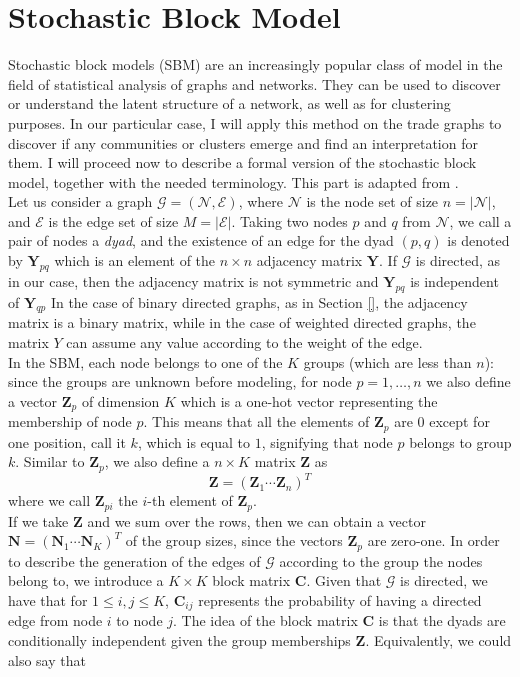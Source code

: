 \section{Stochastic Block Model}\label{sec:sbm}
Stochastic block models (SBM) are an increasingly popular class of model in the field of statistical analysis of graphs and networks. They can be used to discover or understand the latent structure of a network, as well as for clustering purposes. In our particular case, I will apply this method on the trade graphs to discover if any communities or clusters emerge and find an interpretation for them.
I will proceed now to describe a formal version of the stochastic block model, together with the needed terminology. This part is adapted from \textcite{lee2019review}.\\
Let us consider a graph $\mathcal{G} = (\mathcal{N},\mathcal{E})$, where $\mathcal{N}$ is the node set of size $n = |\mathcal{N}|$, and $\mathcal{E}$ is the edge set of size $M = |\mathcal{E}|$. Taking two nodes $p$ and $q$ from $\mathcal{N}$, we call a pair of nodes a \textit{dyad}, and the existence of an edge for the dyad $(p,q)$ is denoted by $\mathbf{Y}_{pq}$ which is an element of the $n \times n$ adjacency matrix $\mathbf{Y}$. If $\mathcal{G}$ is directed, as in our case, then the adjacency matrix is not symmetric and $\mathbf{Y}_{pq}$ is independent of $\mathbf{Y}_{qp}$ In the case of binary directed graphs, as in Section \ref{}, the adjacency matrix is a binary matrix, while in the case of weighted directed graphs, the matrix $Y$ can assume any value according to the weight of the edge.\\
In the SBM, each node belongs to one of the $K$ groups (which are less than $n$): since the groups are unknown before modeling, for node $p = 1,\ldots,n$ we also define a vector $\mathbf{Z}_p$ of dimension $K$ which is a one-hot vector representing the membership of node $p$. This means that all the elements of $\mathbf{Z}_{p}$ are 0 except for one position, call it $k$, which is equal to $1$, signifying that node $p$ belongs to group $k$.
Similar to $\mathbf{Z}_{p}$, we also define a $n \times K$ matrix $\mathbf{Z}$ as
\[
    \mathbf{Z} = (\mathbf{Z}_1 \cdots \mathbf{Z}_n)^T
\]
where we call $\mathbf{Z}_{pi}$ the $i$-th element of $\mathbf{Z}_p$.\\
If we take $\mathbf{Z}$ and we sum over the rows, then we can obtain a vector $\mathbf{N} = (\mathbf{N}_1\cdots\mathbf{N}_K)^T$ of the group sizes, since the vectors $\mathbf{Z}_{p}$ are zero-one.
In order to describe the generation of the edges of $\mathcal{G}$ according to the group the nodes belong to, we introduce a $K \times K$ block matrix $\mathbf{C}$. Given that $\mathcal{G}$ is directed, we have that for $1 \leq i,j \leq K$, $\mathbf{C}_{ij}$ represents the probability of having a directed edge from node $i$ to node $j$. The idea of the block matrix $\mathbf{C}$ is that the dyads are conditionally independent given the group memberships $\mathbf{Z}$. Equivalently, we could also say that
